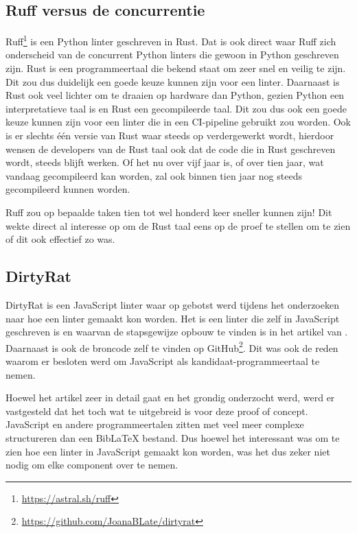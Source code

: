 \subsection{Ruff versus de concurrentie}
\label{subsec:ruff}
Ruff\footnote{\url{https://astral.sh/ruff}} is een Python linter geschreven in Rust. Dat is ook direct waar Ruff zich onderscheid van de concurrent Python linters die gewoon in Python geschreven zijn. Rust is een programmeertaal die bekend staat om zeer snel en veilig te zijn. Dit zou dus duidelijk een goede keuze kunnen zijn voor een linter. Daarnaast is Rust ook veel lichter om te draaien op hardware dan Python, gezien Python een interpretatieve taal is en Rust een gecompileerde taal. 
Dit zou dus ook een goede keuze kunnen zijn voor een linter die in een CI-pipeline gebruikt zou worden. Ook is er slechts één versie van Rust waar steeds op verdergewerkt wordt, hierdoor wensen de developers van de Rust taal ook dat de code die in Rust geschreven wordt, steeds blijft werken. Of het nu over vijf jaar is, of over tien jaar, wat vandaag gecompileerd kan worden, zal ook binnen tien jaar nog steeds gecompileerd kunnen worden. 

Ruff zou op bepaalde taken tien tot wel honderd keer sneller kunnen zijn! Dit wekte direct al interesse op om de Rust taal eens op de proef te stellen om te zien of dit ook effectief zo was. 

\subsection{DirtyRat}
\label{subsec:dirtyrat}
DirtyRat is een JavaScript linter waar op gebotst werd tijdens het onderzoeken naar hoe een linter gemaakt kon worden. Het is een linter die zelf in JavaScript geschreven is en waarvan de stapsgewijze opbouw te vinden is in het artikel van \textcite{BorgesLate2021}. Daarnaast is ook de broncode zelf te vinden op GitHub\footnote{\url{https://github.com/JoanaBLate/dirtyrat}}. Dit was ook de reden waarom er besloten werd om JavaScript als kandidaat-programmeertaal te nemen. 

Hoewel het artikel zeer in detail gaat en het grondig onderzocht werd, werd er vastgesteld dat het toch wat te uitgebreid is voor deze proof of concept. JavaScript en andere programmeertalen zitten met veel meer complexe structureren dan een BibLaTeX bestand. Dus hoewel het interessant was om te zien hoe een linter in JavaScript gemaakt kon worden, was het dus zeker niet nodig om elke component over te nemen.

